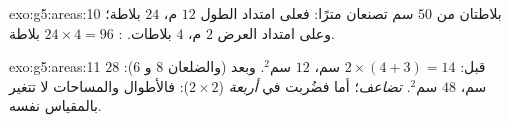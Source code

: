 \begin{solution}{exo:g5:areas:10}
بلاطتان من $50$ سم تصنعان مترًا: فعلى امتداد الطول $12$ م،
$24$ بلاطة؛ وعلى امتداد العرض $2$ م، $4$ بلاطات. :
$24 \times 4 = 96$ بلاطة.
\end{solution}

\begin{solution}{exo:g5:areas:11}
قبل:  $2 \times (4 + 3) = 14$ سم،  $12$ سم$^2$.
وبعد (والضلعان $8$ و $6$):  $28$ سم،  $48$ سم$^2$.
 \emph{تضاعف}؛ أما  فضُربت في
\emph{أربعة} ($2 \times 2$): فالأطوال والمساحات لا تتغير
بالمقياس نفسه.
\end{solution}
